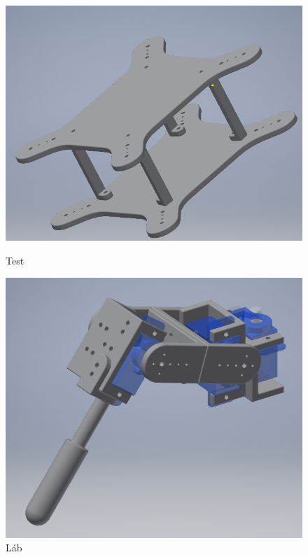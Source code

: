 \documentclass{article}
\begin{document}
\begin{figure}
	\centering
	\begin{minipage}{0.45\textwidth}
		\centering
		\includegraphics[width=\textwidth]{fulltest}
		\caption{Test}
	\end{minipage}\hfill
	\begin{minipage}{0.45\textwidth}
		\centering
		\includegraphics[width=\textwidth]{fulllab}
		\caption{Láb}
	\end{minipage}
\end{figure}
\end{document}

